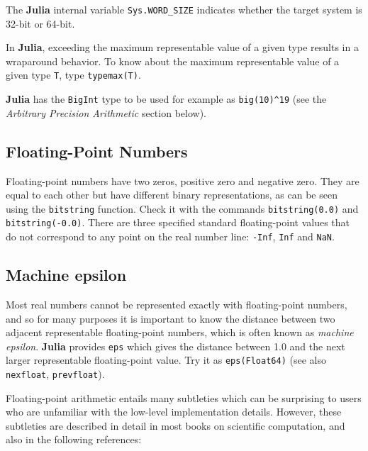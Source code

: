 \documentclass[
]{article}
\begin{document}
The \textbf{Julia} internal variable \texttt{Sys.WORD\_SIZE} indicates
whether the target system is 32-bit or 64-bit.

In \textbf{Julia}, exceeding the maximum representable value of a given
type results in a wraparound behavior. To know about the maximum
representable value of a given type \texttt{T}, type
\texttt{typemax(T)}.

\textbf{Julia} has the \texttt{BigInt} type to be used for example as
\texttt{big(10)\^{}19} (see the \emph{Arbitrary Precision Arithmetic}
section below).

\hypertarget{floating-point-numbers}{%
\subsection{Floating-Point Numbers}\label{floating-point-numbers}}

Floating-point numbers have two zeros, positive zero and negative zero.
They are equal to each other but have different binary representations,
as can be seen using the \texttt{bitstring} function. Check it with the
commands \texttt{bitstring(0.0)} and \texttt{bitstring(-0.0)}. There are
three specified standard floating-point values that do not correspond to
any point on the real number line: \texttt{-Inf}, \texttt{Inf} and
\texttt{NaN}.

\hypertarget{machine-epsilon}{%
\subsection{Machine epsilon}\label{machine-epsilon}}

Most real numbers cannot be represented exactly with floating-point
numbers, and so for many purposes it is important to know the distance
between two adjacent representable floating-point numbers, which is
often known as \emph{machine epsilon}. \textbf{Julia} provides
\texttt{eps} which gives the distance between 1.0 and the next larger
representable floating-point value. Try it as \texttt{eps(Float64)} (see
also \texttt{nexfloat}, \texttt{prevfloat}).

Floating-point arithmetic entails many subtleties which can be
surprising to users who are unfamiliar with the low-level implementation
details. However, these subtleties are described in detail in most books
on scientific computation, and also in the following references:
\end{document}
